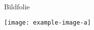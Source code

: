 \begin{frame}{Bildfolie}
	\begin{center}
		\texttt{[image: example-image-a]}
	\end{center}
\end{frame}